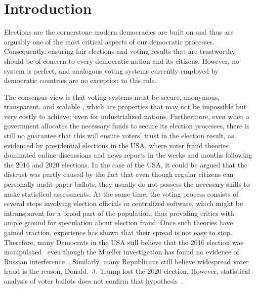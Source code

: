 \chapter{Introduction}\label{ch:intro}

Elections are the cornerstone modern democracies are built on and thus are arguably one of the most critical aspects of our democratic processes.
Consequently, ensuring fair elections and voting results that are trustworthy should be of concern to every democratic nation and its citizens.
However, no system is perfect, and analogous voting systems currently employed by democratic countries are no exception to this rule.

The consensus view is that voting systems must be secure, anonymous, transparent, and scalable
\autocites{lowry_desirable_2009}[5]{agora_agora_nodate}[9-11]{jafar_blockchain_2021},
which are properties that may not be impossible but very costly to achieve;\ even for industrialized nations.
Furthermore, even when a government allocates the necessary funds to secure its election processes, there is still no
guarantee that this will ensure voters’ trust in the election result, as evidenced by presidential elections in the \Gls{USA}, where voter fraud theories dominated online discussions and news reports in the weeks and months following the 2016 and 2020 elections.
In the case of the \Gls{USA}, it could be argued that the distrust was partly caused by the fact that even though regular citizens can personally audit paper ballots, they usually do not possess the necessary skills to make statistical assessments.
At the same time, the voting process consists of several steps involving election officials or centralized software, which might be intransparent for a broad part of the population, thus providing critics with ample ground for speculation about election fraud.
Once such theories have gained traction, experience has shown that their spread is not easy to stop.
Therefore, many Democrats in the \Gls{USA} still believe that the 2016 election was manipulated~\autocite{sinclair_its_2018}
even though the Mueller investigation has found no evidence of Russian interference~\autocite{mueller_report_2019}.
Similarly, many Republicans still believe widespread voter fraud is the reason, Donald.\ J. Trump lost the 2020 election.
However, statistical analysis of voter ballots does not confirm that hypothesis~\autocite{eggers_no_2021}.


